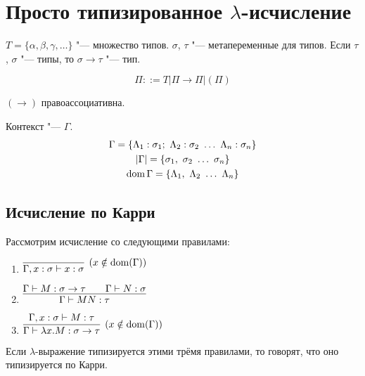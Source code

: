 \section{\texorpdfstring{Просто типизированное $\lambda$-исчисление}{Simply typed lambda calculus}}

\begin{definition}[тип]
    $T = \{\alpha, \beta, \gamma, \ldots\}$ "--- множество типов.
    $\sigma$, $\tau$ "--- метапеременные для типов.
    Если $\tau$, $\sigma$ "--- типы, то $\sigma \rightarrow \tau$ "--- тип.
    \begin{bnf}
    \[
        \Pi ::= T | \Pi \rightarrow \Pi | (\Pi)
    \]
    \end{bnf}
    $\left(\rightarrow\right)$ правоассоциативна.
\end{definition}

\begin{definition}[контекст] Контекст "--- $\Gamma$.
\begin{gather*}
    \Gamma = \{ \Lambda_{1} : \sigma_{1};\ \Lambda_{2} : \sigma_{2}\ \ldots\ \Lambda_{n} : \sigma_{n} \} \\
    \abs{\Gamma} = \{ \sigma_{1},\ \sigma_{2}\ \ldots\ \sigma_{n} \} \\
    \dom \Gamma = \{ \Lambda_{1},\ \Lambda_{2}\ \ldots\ \Lambda_{n} \}
\end{gather*}
\end{definition}

\subsection{\texorpdfstring{Исчисление по Карри}{Curry-style}}

\begin{definition}
    Рассмотрим исчисление со следующими правилами:
    \begin{enumerate}
        \item $\infer[(x \notin \dom(\Gamma))]
            {\Gamma, x:\sigma \vdash x:\sigma}
            {}$
        \item $\infer[]
            {\Gamma \vdash M N : \tau}
            {\Gamma \vdash M:\sigma \rightarrow \tau && \Gamma \vdash N:\sigma}$
        \item $\infer[(x \notin \dom(\Gamma))]
            {\Gamma \vdash \lambda x . M : \sigma \rightarrow \tau}
            {\Gamma, x : \sigma \vdash M : \tau}$
    \end{enumerate}
    Если $\lambda$-выражение типизируется этими трёмя правилами, то говорят, что оно типизируется по Карри.
\end{definition}


